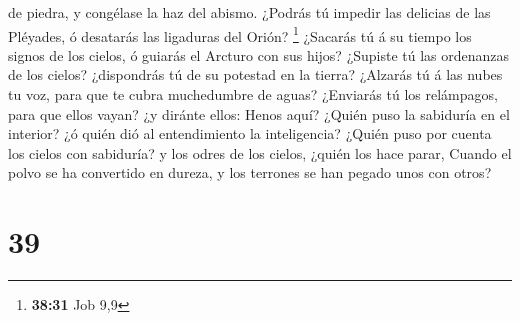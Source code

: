 de piedra, y congélase la haz del abismo.  ¿Podrás tú
impedir las delicias de las Pléyades, ó desatarás las ligaduras del
Orión? \footnote{\textbf{38:31} Job 9,9}  ¿Sacarás tú á su
tiempo los signos de los cielos, ó guiarás el Arcturo con sus hijos?
 ¿Supiste tú las ordenanzas de los cielos? ¿dispondrás tú
de su potestad en la tierra?  ¿Alzarás tú á las nubes tu
voz, para que te cubra muchedumbre de aguas?  ¿Enviarás tú
los relámpagos, para que ellos vayan? ¿y diránte ellos: Henos aquí?
 ¿Quién puso la sabiduría en el interior? ¿ó quién dió al
entendimiento la inteligencia?  ¿Quién puso por cuenta los
cielos con sabiduría? y los odres de los cielos, ¿quién los hace parar,
 Cuando el polvo se ha convertido en dureza, y los terrones
se han pegado unos con otros? 

\hypertarget{section-38}{%
\section{39}\label{section-38}}

